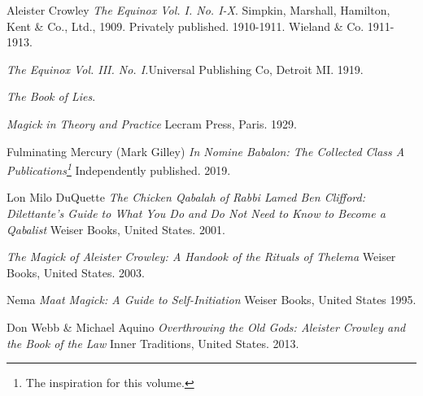 \makeatletter
\renewcommand\@biblabel[1]{}
\makeatother
\renewcommand{\bibname}{Bibliography \& Additional Readings}
\begin{thebibliography}{10}
  Aleister Crowley
  \textit{The Equinox Vol. I. No. I-X}.\footnotemark
  Simpkin, Marshall, Hamilton, Kent \& Co., Ltd., 1909.
  Privately published. 1910-1911.
  Wieland \& Co. 1911-1913.

  \textemdash{}
  \textit{The Equinox Vol. III. No. I.}\footnotemark[\value{footnote}]
  Universal Publishing Co, Detroit MI. 1919.

  \textemdash{}
  \textit{The Book of Lies}.

  \textemdash{}
  \textit{Magick in Theory and Practice}\footnotemark[\value{footnote}]
  Lecram Press, Paris. 1929.


  Fulminating Mercury (Mark Gilley)
  \textit{In Nomine Babalon: The Collected Class A Publications\footnote{The inspiration for this volume.}}
  Independently published. 2019.

  Lon Milo DuQuette
  \textit{The Chicken Qabalah of Rabbi Lamed Ben Clifford: Dilettante's Guide to What You Do and Do Not Need to Know to Become a Qabalist}\footnotemark
  Weiser Books, United States. 2001.

  \textemdash{}
  \textit{The Magick of Aleister Crowley: A Handook of the Rituals of Thelema}\footnotemark[\value{footnote}]
  Weiser Books, United States. 2003.

  Nema
  \textit{Maat Magick: A Guide to Self-Initiation}
  Weiser Books, United States 1995.

  Don Webb \& Michael Aquino
  \textit{Overthrowing the Old Gods: Aleister Crowley and the Book of the Law}
  Inner Traditions, United States. 2013.
\end{thebibliography}
